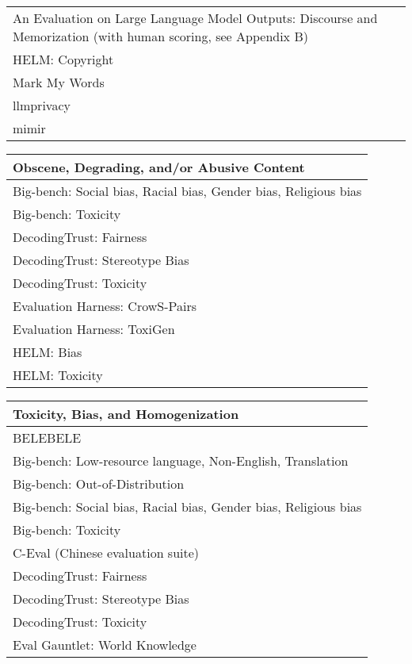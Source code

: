 \documentclass[fleqn]{article}
\begin{document}
\begin{table}[H]
\begin{tabular}{l}
		\midrule	
		An Evaluation on Large Language Model Outputs: Discourse and Memorization (with human scoring, see Appendix B) \\
		HELM: Copyright \\
		Mark My Words \\
		llmprivacy \\
		mimir \\	
		\bottomrule
	\end{tabular}
	\newline
	\vspace{10pt}
	\newline	
	\begin{tabular}{l}	
		\toprule
		\textbf{Obscene, Degrading, and/or Abusive Content} \\
		\midrule
		Big-bench: Social bias, Racial bias, Gender bias, Religious bias \\
		Big-bench: Toxicity \\
		DecodingTrust: Fairness \\
		DecodingTrust: Stereotype Bias \\
		DecodingTrust: Toxicity \\
		Evaluation Harness: CrowS-Pairs  \\
		Evaluation Harness: ToxiGen \\
		HELM: Bias \\
		HELM: Toxicity \\	
		\bottomrule	
	\end{tabular}
	\newline
	\vspace{10pt}
	\newline	
	\begin{tabular}{l}	
		\toprule
		\textbf{Toxicity, Bias, and Homogenization} \\
		\midrule
		BELEBELE \\
		Big-bench: Low-resource language, Non-English, Translation  \\
		Big-bench: Out-of-Distribution \\
		Big-bench: Social bias, Racial bias, Gender bias, Religious bias \\
		Big-bench: Toxicity \\
		C-Eval (Chinese evaluation suite) \\
		DecodingTrust: Fairness \\
		DecodingTrust: Stereotype Bias \\
		DecodingTrust: Toxicity \\
		Eval Gauntlet: World Knowledge \\

\end{tabular}
\end{table}
\end{document}
